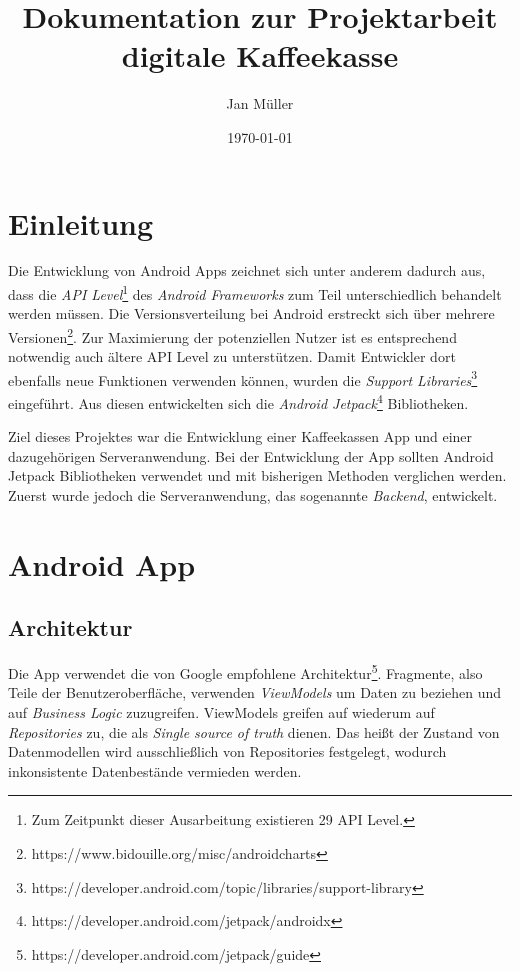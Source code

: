 \documentclass[a4paper, 11pt]{article}
\title{Dokumentation zur Projektarbeit digitale Kaffeekasse}
\author{Jan Müller}
\date{\today}
\begin{document}
\maketitle

\section{Einleitung}
\label{sec:intro}

Die Entwicklung von Android Apps zeichnet sich unter anderem dadurch aus, dass die \textit{API Level}\footnote{Zum Zeitpunkt dieser Ausarbeitung existieren 29 API Level.} des \textit{Android Frameworks} zum Teil unterschiedlich behandelt werden müssen.
Die Versionsverteilung bei Android erstreckt sich über mehrere Versionen\footnote{https://www.bidouille.org/misc/androidcharts}.
Zur Maximierung der potenziellen Nutzer ist es entsprechend notwendig auch ältere API Level zu unterstützen.
Damit Entwickler dort ebenfalls neue Funktionen verwenden können, wurden die \textit{Support Libraries}\footnote{https://developer.android.com/topic/libraries/support-library} eingeführt.
Aus diesen entwickelten sich die \textit{Android Jetpack}\footnote{https://developer.android.com/jetpack/androidx} Bibliotheken.

Ziel dieses Projektes war die Entwicklung einer Kaffeekassen App und einer dazugehörigen Serveranwendung.
Bei der Entwicklung der App sollten Android Jetpack Bibliotheken verwendet und mit bisherigen Methoden verglichen werden.
Zuerst wurde jedoch die Serveranwendung, das sogenannte \textit{Backend}, entwickelt.

\section{Android App}
\label{sec:app}

\subsection{Architektur}
\label{subsec:app:architecture}

Die App verwendet die von Google empfohlene Architektur\footnote{https://developer.android.com/jetpack/guide}.
Fragmente, also Teile der Benutzeroberfläche, verwenden \textit{ViewModels} um Daten zu beziehen und auf \textit{Business Logic} zuzugreifen.
ViewModels greifen auf wiederum auf \textit{Repositories} zu, die als \textit{Single source of truth} dienen.
Das heißt der Zustand von Datenmodellen wird ausschließlich von Repositories festgelegt, wodurch inkonsistente Datenbestände vermieden werden.
\end{document}
